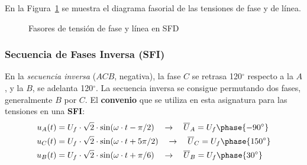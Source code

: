 	En la Figura~\ref{fig.linea-fase-SFD} se muestra el diagrama fasorial de las tensiones de fase y de línea. 
	\begin{figure}[H]
		\centering
		\hfil
		\caption{Fasores de tensión de fase y línea en SFD}
		\label{fig.linea-fase-SFD}
	\end{figure}
	
	\subsubsection{Secuencia de Fases Inversa (SFI)}
	
	En la \textit{secuencia inversa} ($ACB$, negativa), la fase $C$ se retrasa 120$^\circ$ respecto a la $A$, y la $B$, se adelanta 120$^\circ$. La secuencia inversa se consigue permutando dos fases, generalmente $B$ por $C$. El \textbf{convenio} que se utiliza en esta asignatura para las tensiones en una \textbf{SFI}:
	\begin{align*}
		u_{A}(t)&=U_f\cdot\sqrt{2}\cdot \sin(\omega\cdot t -\pi/2) \quad\rightarrow\quad \overline{U}_{A}=U_f\phase {-90^\circ}\\
		u_{C}(t)&=U_f\cdot\sqrt{2}\cdot \sin(\omega\cdot t +5\pi/2) \quad\rightarrow\quad \overline{U}_{C}=U_f\phase {150^\circ}\\
		u_{B}(t)&=U_f\cdot\sqrt{2}\cdot \sin(\omega\cdot t +\pi/6) \quad\rightarrow\quad \overline{U}_{B}=U_f\phase {30^\circ}
	\end{align*}
	
